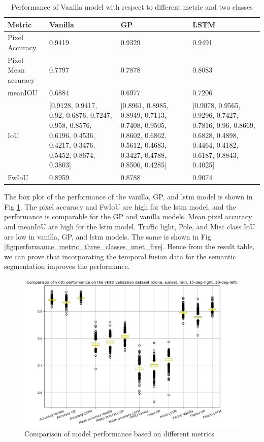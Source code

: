 	\begin{table}
		\begin{center}
			\begin{tabular}{ | l | p{4cm} | p{4cm} | p{4cm} |}
				\hline
				
				\cellcolor{purple!30}Metric & \cellcolor{purple!30}Vanilla & \cellcolor{purple!30}GP & \cellcolor{purple!30}LSTM\\ \hline
				Pixel Accuracy & 0.9419 & 0.9329 & 0.9491 \\ \hline
				Pixel Mean accuracy & 0.7797 & 0.7878 & 0.8083 \\ \hline
				meanIOU & 0.6884 & 0.6977 & 0.7206 \\ \hline
				IoU & [0.9128, 0.9417, 0.92, 0.6876, 0.7247, 0.958, 0.8576, 0.6196, 0.4536, 0.4217, 0.3476, 0.5452, 0.8674, 0.3803] & 
				[0.8961, 0.8985, 0.8949, 0.7113, 0.7408, 0.9505, 0.8602, 0.6862, 0.5612, 0.4683, 0.3427, 0.4788, 0.8506, 0.4285]
				& [0.9078, 0.9565, 0.9296, 0.7427, 0.7816, 0.96, 0.8669, 0.6828, 0.4898, 0.4464, 0.4182, 0.6187, 0.8843, 0.4025]
				\\ \hline
				FwIoU & 0.8959 & 0.8788 & 0.9074 \\ \hline
				\hline
			\end{tabular}
			\caption{Performance of Vanilla model with respect to different metric and two classes}
			\label{table:Vanilla_conti_seq}
		\end{center}
	\end{table}
	
	The box plot of the performance of the vanilla, GP, and lstm model is shown in Fig \ref{fig:performance_metric_unet}. The pixel accuracy and  FwIoU are high for the lstm model, and the performance is comparable for the GP and vanilla models. Mean pixel accuracy and meanIoU are high for the lstm model. Traffic light, Pole, and Misc class IoU are low in vanilla, GP, and lstm models. The same is shown in Fig \ref{fig:performance_metric_three_classes_unet_five}. Hence from the result table, we can prove that incorporating the temporal fusion data for the semantic segmentation improves the performance. 
	
	\begin{figure}[h]
		\centering
		\includegraphics[width=12cm]{images/vkitti_validation_data_five_class_box_plot.png}
		\caption{Comparison of model performance based on different metrics}
		\label{fig:performance_metric_unet}
	\end{figure}
	
